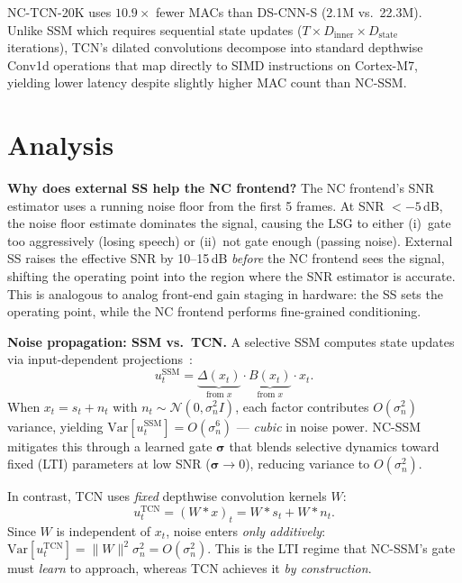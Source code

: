 \documentclass[conference]{IEEEtran}
\begin{document}
NC-TCN-20K uses $10.9\times$ fewer MACs than DS-CNN-S (2.1M vs.\ 22.3M).
Unlike SSM which requires sequential state updates ($T{\times}D_{\text{inner}}{\times}D_{\text{state}}$ iterations), TCN's dilated convolutions decompose into standard depthwise Conv1d operations that map directly to SIMD instructions on Cortex-M7, yielding lower latency despite slightly higher MAC count than NC-SSM.

\section{Analysis}
\label{sec:analysis}

\textbf{Why does external SS help the NC frontend?}
The NC frontend's SNR estimator uses a running noise floor from the first 5 frames.
At SNR $< -5$\,dB, the noise floor estimate dominates the signal, causing the LSG to either (i)~gate too aggressively (losing speech) or (ii)~not gate enough (passing noise).
External SS raises the effective SNR by 10--15\,dB \emph{before} the NC frontend sees the signal, shifting the operating point into the region where the SNR estimator is accurate.
This is analogous to analog front-end gain staging in hardware: the SS sets the operating point, while the NC frontend performs fine-grained conditioning.

\textbf{Noise propagation: SSM vs.\ TCN.}
A selective SSM computes state updates via input-dependent projections~\cite{choi2026ncssm}:
\begin{equation}
u_t^{\text{SSM}} = \underbrace{\Delta(x_t)}_{\text{from }x} \cdot \underbrace{B(x_t)}_{\text{from }x} \cdot x_t.
\label{eq:ssm_noise}
\end{equation}
When $x_t = s_t + n_t$ with $n_t \sim \mathcal{N}(0, \sigma_n^2 I)$, each factor contributes $O(\sigma_n^2)$ variance, yielding $\text{Var}[u_t^{\text{SSM}}] = O(\sigma_n^6)$ --- \emph{cubic} in noise power.
NC-SSM mitigates this through a learned gate $\bm{\sigma}$ that blends selective dynamics toward fixed (LTI) parameters at low SNR ($\bm{\sigma}{\to}0$), reducing variance to $O(\sigma_n^2)$.

In contrast, TCN uses \emph{fixed} depthwise convolution kernels $W$:
\begin{equation}
u_t^{\text{TCN}} = (W \ast x)_t = W \ast s_t + W \ast n_t.
\label{eq:tcn_noise}
\end{equation}
Since $W$ is independent of $x_t$, noise enters \emph{only additively}: $\text{Var}[u_t^{\text{TCN}}] = \|W\|^2 \sigma_n^2 = O(\sigma_n^2)$.
This is the LTI regime that NC-SSM's gate must \emph{learn} to approach, whereas TCN achieves it \emph{by construction}.
\end{document}
